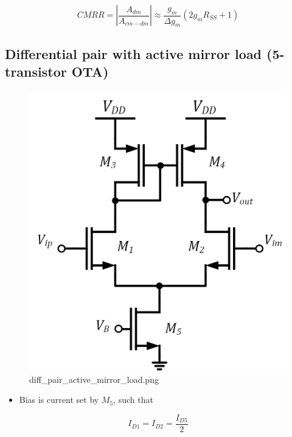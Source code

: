 \documentclass[11pt]{article}
\providecommand{\tightlist}{%
      \setlength{\itemsep}{0pt}\setlength{\parskip}{0pt}}
\begin{document}
\begin{equation}
CMRR = \left| \dfrac{A_{dm}}{A_{cm-dm}} \right| \approx \dfrac{g_m}{\Delta g_m}(2g_{m}R_{SS} + 1)
\end{equation}

    \hypertarget{differential-pair-with-active-mirror-load-5-transistor-ota}{%
\subsection{Differential pair with active mirror load (5-transistor
OTA)}\label{differential-pair-with-active-mirror-load-5-transistor-ota}}

    \begin{figure}
\centering
\includegraphics{diff_pair_active_mirror_load.png}
\caption{diff\_pair\_active\_mirror\_load.png}
\end{figure}

    \begin{itemize}
\tightlist
\item
  Bias is current set by \(M_5\), such that
\end{itemize}

\begin{equation} 
I_{D1} = I_{D2} = \dfrac{I_{D5}}{2}
\end{equation}
\end{document}
